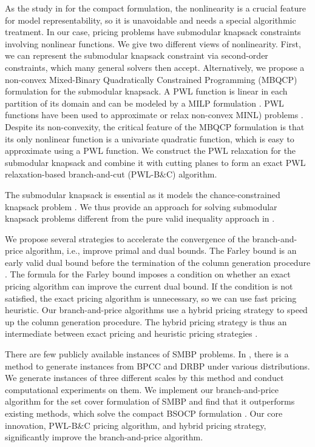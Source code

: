  As the study in \cite{zhang2018ambiguous} for the compact formulation, the nonlinearity is a crucial feature for model representability, so it is unavoidable and needs a special algorithmic treatment. In our case, pricing problems have submodular knapsack constraints involving nonlinear functions. We give two different views of nonlinearity. First, we can represent the submodular knapsack constraint via second-order constraints, which many general solvers then accept. Alternatively, we propose a non-convex Mixed-Binary Quadratically Constrained Programming (MBQCP) formulation for the submodular knapsack. A PWL  function is linear in each partition of its domain and can be modeled by a MILP formulation \citep{vielma2010}. PWL functions have been used to approximate or relax non-convex MINL) problems \citep{geissler2012using}.  Despite its non-convexity, the critical feature of the MBQCP formulation is that its only nonlinear function is a univariate quadratic function, which is easy to approximate using a PWL function. We construct the PWL relaxation for the submodular knapsack and combine it with cutting planes to form an exact PWL relaxation-based branch-and-cut (PWL-B$\&$C) algorithm.

 The submodular knapsack  is essential as it models the chance-constrained knapsack problem \citep{goyal2010ptas}. We thus provide an approach for solving submodular knapsack problems different  from the pure valid inequality approach in \cite{atamturk2008polymatroids,atamturk2009submodular}.
 
 We propose  several strategies to accelerate the convergence of the branch-and-price algorithm, i.e., improve primal and dual bounds. The Farley bound \cite{farley1990note,vance1994solving}  is an early valid dual bound before the termination of the column generation procedure \cite{wei2020new, gleixner2020price}.
The formula for the Farley bound imposes a condition on whether an exact pricing algorithm can improve the current dual bound. If the condition is not satisfied, the exact pricing algorithm is unnecessary, so we can use fast pricing heuristic. Our branch-and-price algorithms use a hybrid pricing strategy to speed up the column generation procedure. The hybrid pricing strategy is thus an intermediate between exact pricing and heuristic pricing strategies \cite{blanco2023branch}.
 
 There are few publicly available instances of SMBP problems. In \cite{cohen2019overcommitment}, there is a method to generate instances from BPCC and DRBP under various distributions. We generate instances of three different scales  by this method and conduct computational experiments on them. We implement our branch-and-price algorithm for the set cover formulation of SMBP and find that it outperforms existing methods, which solve the compact BSOCP formulation \cite{zhang2018ambiguous}. Our core innovation,  PWL-B$\&$C pricing algorithm, and hybrid pricing strategy, significantly improve the branch-and-price algorithm.
 






